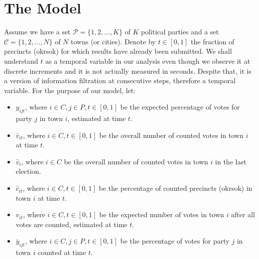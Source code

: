 \documentclass[12pt]{article}
\begin{document}
\section{The Model}
Assume we have a set $\mathcal{P} = \{1,2,\ldots,K\}$ of $K$ political parties and a set $\mathcal{C} = \{1,2,\ldots,N\}$ of $N$ towns (or cities). Denote by $t\in [0,1]$ the fraction of precincts (okrsok) for which results have already been submitted. We shall understand $t$ as a temporal variable in our analysis even though we observe it at discrete increments and it is not actually measured in seconds. Despite that, it is a version of information filtration at consecutive steps, therefore a temporal variable. For the purpose of our model, let:

\begin{itemize}
	\item{} $y_{ijt}$, where $ i\in C, j\in P, t\in [0,1]$ be the expected percentage of votes for party $j$ in town $i$, estimated at time $t$.
	\item{} $\bar{v}_{it}$, where $ i\in C, t\in [0,1]$ be the overall number of counted votes in town $i$ at time $t$.
	\item{} $\hat{v}_{i}$, where $ i\in C$ be the overall number of counted votes in town $i$ in the last election.
	\item{} $\hat{c}_{it}$, where $ i\in C, t\in [0,1]$ be the percentage of counted precincts (okrsok) in town $i$ at time $t$.	
	\item{} $v_{it}$, where $ i\in C, t\in [0,1]$ be the expected number of votes in town $i$ after all votes are counted, estimated at time $t$.
	\item{} $\bar{y}_{ijt}$, where $ i\in C, j\in P, t\in [0,1]$ be the percentage of votes for party $j$ in town $i$ counted at time $t$.
\end{itemize}






\end{document}
